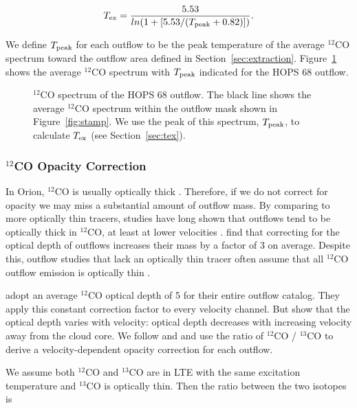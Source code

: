 \documentclass[twocolumn]{aastex63}
\newcommand{\example}{HOPS 68}
\newcommand{\tex}{$T_{\rm ex}$}
\newcommand{\co}[1][]{\ensuremath{^{#1}}CO}
\begin{document}
\begin{equation}\label{eq:Tex}
T_{\rm ex} = \frac{5.53}{ln(1 + [5.53/(T_{\rm peak} + 0.82)])}.
\end{equation}

We define $T_{\rm peak}$ for each outflow to be the peak temperature of the average $^{12}$CO spectrum toward the outflow area defined in Section~\ref{sec:extraction}. Figure~\ref{fig:tex} shows the average $^{12}$CO spectrum with $T_{\rm peak}$ indicated for the \example{} outflow.

\begin{figure}
\caption{\co[12]{} spectrum of the \example{} outflow. The black line shows the average \co[12]{} spectrum within the outflow mask shown in Figure~\ref{fig:stamp}. We use the peak of this spectrum, $T_{\rm peak}$, to calculate \tex{} (see Section~\ref{sec:tex}). \label{fig:tex}}
\end{figure}


\subsubsection{$^{12}$CO Opacity Correction}\label{sec:opacity}
In Orion, \co[12]{} is usually optically thick \citep{Kong18}. Therefore, if we do not correct for opacity we may miss a substantial amount of outflow mass. By comparing to more optically thin tracers, studies have long shown that outflows tend to be optically thick in \co[12]{}, at least at lower velocities \citep[e.g.,][]{Goldsmith84,Arce01}. \citet{Dunham14} find that correcting for the optical depth of outflows increases their mass by a factor of 3 on average. Despite this, outflow studies that lack an optically thin tracer often assume that all \co[12]{} outflow emission is optically thin \citep[e.g. in Orion,][]{Morgan91,Takahashi08}. 

\citet{Tanabe:submitted} adopt an average \co[12]{} optical depth of 5 for their entire outflow catalog. They apply this constant correction factor to every velocity channel. But \citet{Dunham14} show that the optical depth varies with velocity: optical depth decreases with increasing velocity away from the cloud core. We follow \citet{Dunham14} and \citet{ZhangY16} and use the ratio of $^{12}$CO / $^{13}$CO to derive a velocity-dependent opacity correction for each outflow.

We assume both \co[12]{} and \co[13]{} are in LTE with the same excitation temperature and \co[13]{} is optically thin. Then the ratio between the two isotopes is
\end{document}
